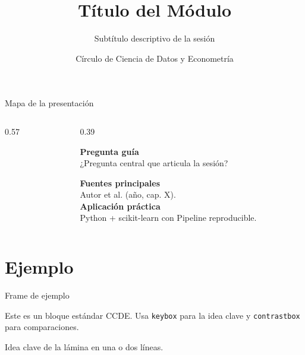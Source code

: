 \documentclass[aspectratio=169,11pt,table]{beamer}
\title{Título del Módulo}
\subtitle{Subtítulo descriptivo de la sesión}
\author{Círculo de Ciencia de Datos y Econometría}
\date{} %
\begin{document}

\begin{frame}{Mapa de la presentación}
\begin{columns}[T,onlytextwidth]
\begin{column}{0.57\textwidth}
{\small\tableofcontents}
\end{column}
\begin{column}{0.39\textwidth}
\begin{keybox}
\textbf{Pregunta guía}\\[0.14cm]
¿Pregunta central que articula la sesión?
\end{keybox}
\vspace{0.16cm}
\begin{ccdebox}
\small
\textbf{Fuentes principales}\\
Autor et al. (año, cap. X).\\[0.12cm]
\textbf{Aplicación práctica}\\
Python + scikit-learn con Pipeline reproducible.
\end{ccdebox}
\end{column}
\end{columns}
\end{frame}

\section{Ejemplo}

\begin{frame}{Frame de ejemplo}
\begin{ccdebox}
Este es un bloque estándar CCDE. Usa \texttt{keybox} para la idea clave y
\texttt{contrastbox} para comparaciones.
\end{ccdebox}
\begin{keybox}
Idea clave de la lámina en una o dos líneas.
\end{keybox}
\end{frame}
\end{document}
